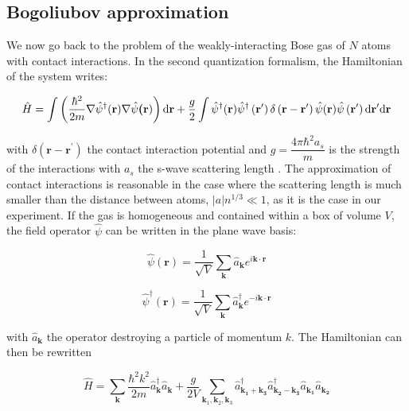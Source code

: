 \subsection{Bogoliubov approximation}

\label{sec:bogo_approx}


We now go back to the problem of the weakly-interacting Bose gas of $N$ atoms with contact interactions. In the second quantization formalism, the Hamiltonian of the system writes:


\begin{equation}
    \hat{H}=\int\left(\frac{\hbar^{2}}{2 m} \nabla \hat{\psi}^{\dagger}(\textbf{r}) \nabla \hat{\psi}\textbf{(r})\right) {\rm d} \textbf{r}+\frac{g}{2} \int \hat{\psi}^{\dagger}(\textbf{r}) \hat{\psi}^{\dagger}\left(\textbf{r}^{\prime}\right) \delta\left(\textbf{r}-\textbf{r}^{\prime}\right) \hat{\psi}(\textbf{r}) \hat{\psi}\left(\textbf{r}^{\prime}\right) {\rm d} \textbf{r}^{\prime} {\rm d} \textbf{r}
    \label{eq:bogo_general}
\end{equation}

\noindent with $\delta\left(\textbf{r}-\textbf{r}^{\prime}\right)$ the contact interaction potential and $g=\dfrac{4 \pi \hbar^2 a_s}{m}$ is the strength of the interactions with $a_s$ the s-wave scattering length \cite{landau2013quantum}. The approximation of contact interactions is reasonable in the case where the scattering length is much smaller than the distance between atoms, $|a| n^{1/3} \ll 1$, as it is the case in our experiment. If the gas is homogeneous and contained within a box of volume $V$, the field operator $\hat{\psi}$ can be written in the plane wave basis:

\begin{equation}
    \hat{\psi}(\bm{r})=\frac{1}{\sqrt{V}} \sum_{\bm{k}} \hat{a}_{\bm{k}} e^{i \bm{k} \cdot \bm{r}}
\end{equation}

\begin{equation}
    \hat{\psi}^{\dagger}(\bm{r})=\frac{1}{\sqrt{V}} \sum_{\bm{k}} \hat{a}^{\dagger}_{\bm{k}} e^{-i \bm{k} \cdot \bm{r}}
\end{equation}

\noindent with $\hat{a}_{\bm{k}}$ the operator destroying a particle of momentum $k$. The Hamiltonian can then be rewritten

\begin{equation}
    \hat{H}=\sum_{\bm{k}}\frac{\hbar^2 k^2}{2m} \hat{a}^{\dagger}_{\bm{k}}  \hat{a}_{\bm{k}} +  \frac{g}{2V} \sum_{\bm{k}_1,\bm{k}_2,\bm{k}_3} \hat{a}^{\dagger}_{\bm{k_1}+\bm{k_3}} \hat{a}^{\dagger}_{\bm{k_2}-\bm{k_3}} \hat{a}_{\bm{k_1}} \hat{a}_{\bm{k_2}} 
\end{equation}

